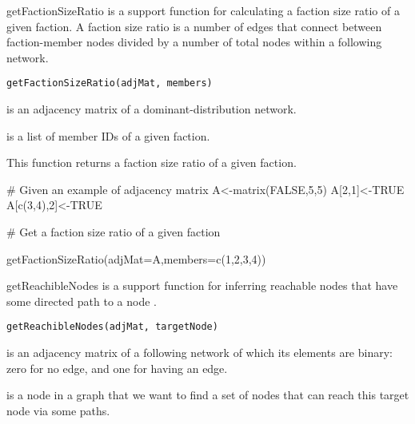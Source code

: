 \documentclass[a4paper]{book}
\begin{document}
%
\begin{Description}\relax
getFactionSizeRatio is a support function for calculating a faction size ratio of a given faction.
A faction size ratio is a number of edges that connect between faction-member nodes divided by a number of total nodes within a following network.
\end{Description}
%
\begin{Usage}
\begin{verbatim}
getFactionSizeRatio(adjMat, members)
\end{verbatim}
\end{Usage}
%
\begin{Arguments}
\begin{ldescription}
\item[\code{adjMat}] is an adjacency matrix of a dominant-distribution network.

\item[\code{members}] is a list of member IDs of a given faction.
\end{ldescription}
\end{Arguments}
%
\begin{Value}
This function returns a faction size ratio of a given faction.
\end{Value}
%
\begin{Examples}
\begin{ExampleCode}

# Given an example of adjacency matrix
A<-matrix(FALSE,5,5)
A[2,1]<-TRUE
A[c(3,4),2]<-TRUE

# Get a faction size ratio of a given faction

getFactionSizeRatio(adjMat=A,members=c(1,2,3,4))

\end{ExampleCode}
\end{Examples}
%
\begin{Description}\relax
getReachibleNodes is a support function for inferring reachable nodes that have some directed path to a node .
\end{Description}
%
\begin{Usage}
\begin{verbatim}
getReachibleNodes(adjMat, targetNode)
\end{verbatim}
\end{Usage}
%
\begin{Arguments}
\begin{ldescription}
\item[\code{adjMat}] is an adjacency matrix of a following network of which its elements are binary: zero for no edge, and one for having an edge.

\item[\code{targetNode}] is a node in a graph that we want to find a set of nodes that can reach this target node via some paths.
\end{ldescription}
\end{Arguments}
\end{document}
